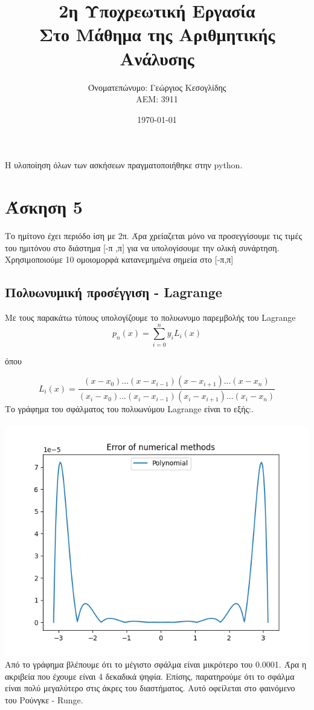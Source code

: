 \documentclass[a4paper,11pt]{article}
\title{2η Υποχρεωτική Εργασία \\ Στο Μάθημα της Αριθμητικής Ανάλυσης}
\author{Όνοματεπώνυμο: Γεώργιος Κεσογλίδης  \\  ΑΕΜ: 3911}
\date{\today}
\newcommand{\gt}{\greektext}
\newcommand{\lt}{\latintext}
\begin{document}
\maketitle
H υλοποίηση όλων των ασκήσεων πραγματοποιήθηκε στην \lt python. \gt

\section{Άσκηση 5}

Το ημίτονο έχει περιόδο ίση με 2π. Άρα χρείαζεται μόνο να προσεγγίσουμε τις τιμές του ημιτόνου στο διάστημα [-π ,π] για να υπολογίσουμε την ολική συνάρτηση. \\
Χρησιμοποιούμε 10 ομοιομορφά κατανεμημένα σημεία στο [-π,π]

\subsection{Πολυωνυμική προσέγγιση - \lt Lagrange}
Με τους παρακάτω τύπους υπολογίζουμε το πολυωνυμο παρεμβολής του \lt Lagrange \gt
\begin{equation*}
p_n(x) = \sum_{i=0}^{n}y_iL_i(x)
\end{equation*}
\begin{center}
όπου
\end{center}
\begin{equation*}
L_i(x) = \frac{(x-x_0)...(x-x_{i-1})(x-x_{i+1})...(x-x_n)}{(x_i-x_0)...(x_i-x_{i-1})(x_i-x_{i+1})...(x_i-x_n)}
\end{equation*}
Το γράφημα του σφάλματος του πολυωνύμου \lt Lagrange \gt είναι το εξής:. \\ \\
\hspace*{-2 cm}
\includegraphics[scale=1]{poly.png}
Από το γράφημα βλέπουμε ότι το μέγιστο σφάλμα είναι μικρότερο του 0.0001. Άρα η ακριβεία που έχουμε είναι 4 δεκαδικά ψηφία. Επίσης, παρατηρούμε ότι το σφάλμα είναι πολύ μεγαλύτερο στις άκρες του διαστήματος. Αυτό οφείλεται στο φαινόμενο του Ρούνγκε \lt - Runge. \gt
\end{document}
